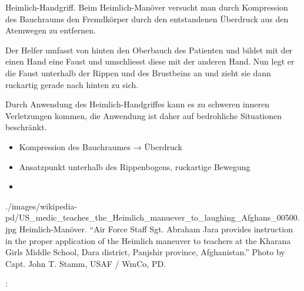 {%
\label{topic:heimlich-manoever}%
 Heimlich-Handgriff. Beim Heimlich-Manöver
versucht man durch Kompression des Bauchraums den Fremdkörper
durch den entstandenen Überdruck aus den Atemwegen zu
entfernen.

Der Helfer umfasst von hinten den Oberbauch des Patienten und
bildet mit der einen Hand eine Faust und umschliesst diese
mit der anderen Hand. Nun legt er die Faust unterhalb der
Rippen und des Brustbeins an und zieht sie dann ruckartig
gerade nach hinten zu sich.

 Durch Anwendung des
Heimlich-Handgriffes kann es zu schweren inneren Verletzungen
kommen, die Anwendung ist daher auf bedrohliche Situationen
beschränkt.
}{%
\begin{itemize}
  \item Kompression des Bauchraumes → Überdruck
  \item Ansatzpunkt unterhalb des Rippenbogens, ruckartige Bewegung
  \item {}
\end{itemize}
}
{./images/wikipedia-pd/US_medic_teaches_the_Heimlich_manuever_to_laughing_Afghans_00500.jpg}
{Heimlich-Manöver.}
{\enquote{Air Force Staff Sgt. Abraham Jara provides instruction in the proper
application of the Heimlich maneuver to teachers at the Kharana Girls Middle
School, Dara district, Panjshir province, Afghanistan.} Photo by 
Capt. John T. Stamm, USAF / WmCo, PD.}




 {%
: 


}{}

 



